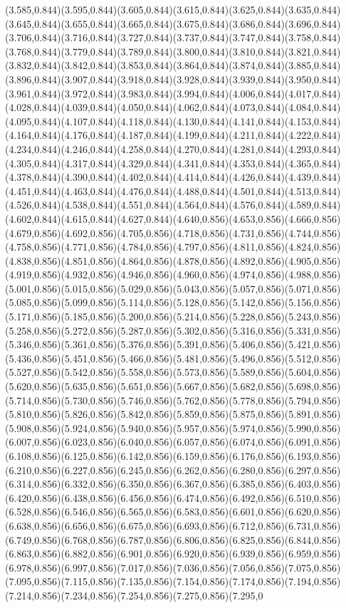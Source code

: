 \documentclass[smallextended]{svjour3}
\begin{document}
(3.585,0.844)(3.595,0.844)(3.605,0.844)(3.615,0.844)(3.625,0.844)(3.635,0.844)(3.645,0.844)(3.655,0.844)(3.665,0.844)(3.675,0.844)(3.686,0.844)(3.696,0.844)(3.706,0.844)(3.716,0.844)(3.727,0.844)(3.737,0.844)(3.747,0.844)(3.758,0.844)(3.768,0.844)(3.779,0.844)(3.789,0.844)(3.800,0.844)(3.810,0.844)(3.821,0.844)(3.832,0.844)(3.842,0.844)(3.853,0.844)(3.864,0.844)(3.874,0.844)(3.885,0.844)(3.896,0.844)(3.907,0.844)(3.918,0.844)(3.928,0.844)(3.939,0.844)(3.950,0.844)(3.961,0.844)(3.972,0.844)(3.983,0.844)(3.994,0.844)(4.006,0.844)(4.017,0.844)(4.028,0.844)(4.039,0.844)(4.050,0.844)(4.062,0.844)(4.073,0.844)(4.084,0.844)(4.095,0.844)(4.107,0.844)(4.118,0.844)(4.130,0.844)(4.141,0.844)(4.153,0.844)(4.164,0.844)(4.176,0.844)(4.187,0.844)(4.199,0.844)(4.211,0.844)(4.222,0.844)(4.234,0.844)(4.246,0.844)(4.258,0.844)(4.270,0.844)(4.281,0.844)(4.293,0.844)(4.305,0.844)(4.317,0.844)(4.329,0.844)(4.341,0.844)(4.353,0.844)(4.365,0.844)(4.378,0.844)(4.390,0.844)(4.402,0.844)(4.414,0.844)(4.426,0.844)(4.439,0.844)(4.451,0.844)(4.463,0.844)(4.476,0.844)(4.488,0.844)(4.501,0.844)(4.513,0.844)(4.526,0.844)(4.538,0.844)(4.551,0.844)(4.564,0.844)(4.576,0.844)(4.589,0.844)(4.602,0.844)(4.615,0.844)(4.627,0.844)(4.640,0.856)(4.653,0.856)(4.666,0.856)(4.679,0.856)(4.692,0.856)(4.705,0.856)(4.718,0.856)(4.731,0.856)(4.744,0.856)(4.758,0.856)(4.771,0.856)(4.784,0.856)(4.797,0.856)(4.811,0.856)(4.824,0.856)(4.838,0.856)(4.851,0.856)(4.864,0.856)(4.878,0.856)(4.892,0.856)(4.905,0.856)(4.919,0.856)(4.932,0.856)(4.946,0.856)(4.960,0.856)(4.974,0.856)(4.988,0.856)(5.001,0.856)(5.015,0.856)(5.029,0.856)(5.043,0.856)(5.057,0.856)(5.071,0.856)(5.085,0.856)(5.099,0.856)(5.114,0.856)(5.128,0.856)(5.142,0.856)(5.156,0.856)(5.171,0.856)(5.185,0.856)(5.200,0.856)(5.214,0.856)(5.228,0.856)(5.243,0.856)(5.258,0.856)(5.272,0.856)(5.287,0.856)(5.302,0.856)(5.316,0.856)(5.331,0.856)(5.346,0.856)(5.361,0.856)(5.376,0.856)(5.391,0.856)(5.406,0.856)(5.421,0.856)(5.436,0.856)(5.451,0.856)(5.466,0.856)(5.481,0.856)(5.496,0.856)(5.512,0.856)(5.527,0.856)(5.542,0.856)(5.558,0.856)(5.573,0.856)(5.589,0.856)(5.604,0.856)(5.620,0.856)(5.635,0.856)(5.651,0.856)(5.667,0.856)(5.682,0.856)(5.698,0.856)(5.714,0.856)(5.730,0.856)(5.746,0.856)(5.762,0.856)(5.778,0.856)(5.794,0.856)(5.810,0.856)(5.826,0.856)(5.842,0.856)(5.859,0.856)(5.875,0.856)(5.891,0.856)(5.908,0.856)(5.924,0.856)(5.940,0.856)(5.957,0.856)(5.974,0.856)(5.990,0.856)(6.007,0.856)(6.023,0.856)(6.040,0.856)(6.057,0.856)(6.074,0.856)(6.091,0.856)(6.108,0.856)(6.125,0.856)(6.142,0.856)(6.159,0.856)(6.176,0.856)(6.193,0.856)(6.210,0.856)(6.227,0.856)(6.245,0.856)(6.262,0.856)(6.280,0.856)(6.297,0.856)(6.314,0.856)(6.332,0.856)(6.350,0.856)(6.367,0.856)(6.385,0.856)(6.403,0.856)(6.420,0.856)(6.438,0.856)(6.456,0.856)(6.474,0.856)(6.492,0.856)(6.510,0.856)(6.528,0.856)(6.546,0.856)(6.565,0.856)(6.583,0.856)(6.601,0.856)(6.620,0.856)(6.638,0.856)(6.656,0.856)(6.675,0.856)(6.693,0.856)(6.712,0.856)(6.731,0.856)(6.749,0.856)(6.768,0.856)(6.787,0.856)(6.806,0.856)(6.825,0.856)(6.844,0.856)(6.863,0.856)(6.882,0.856)(6.901,0.856)(6.920,0.856)(6.939,0.856)(6.959,0.856)(6.978,0.856)(6.997,0.856)(7.017,0.856)(7.036,0.856)(7.056,0.856)(7.075,0.856)(7.095,0.856)(7.115,0.856)(7.135,0.856)(7.154,0.856)(7.174,0.856)(7.194,0.856)(7.214,0.856)(7.234,0.856)(7.254,0.856)(7.275,0.856)(7.295,0
\end{document}
